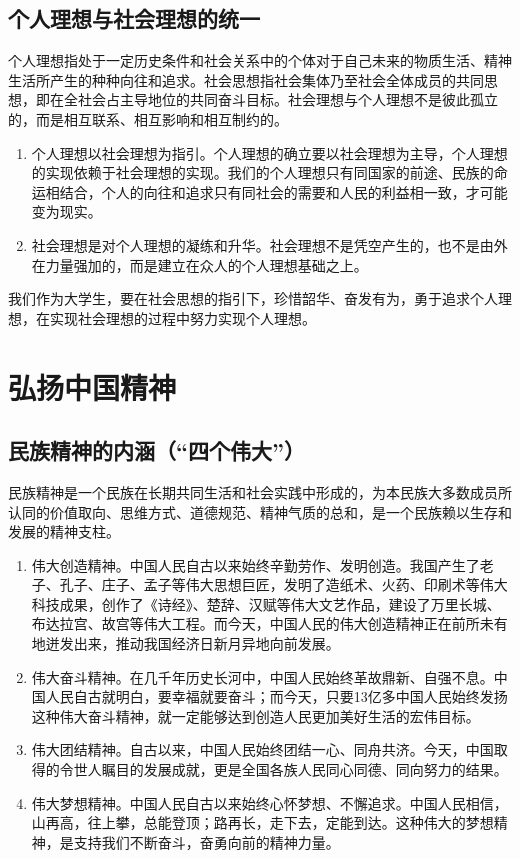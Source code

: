 \subsection{个人理想与社会理想的统一}
个人理想指处于一定历史条件和社会关系中的个体对于自己未来的物质生活、精神生活所产生的种种向往和追求。社会思想指社会集体乃至社会全体成员的共同思想，即在全社会占主导地位的共同奋斗目标。社会理想与个人理想不是彼此孤立的，而是相互联系、相互影响和相互制约的。
\begin{enumerate}
\item 个人理想以社会理想为指引。个人理想的确立要以社会理想为主导，个人理想的实现依赖于社会理想的实现。我们的个人理想只有同国家的前途、民族的命运相结合，个人的向往和追求只有同社会的需要和人民的利益相一致，才可能变为现实。
\item 社会理想是对个人理想的凝练和升华。社会理想不是凭空产生的，也不是由外在力量强加的，而是建立在众人的个人理想基础之上。
\end{enumerate}

我们作为大学生，要在社会思想的指引下，珍惜韶华、奋发有为，勇于追求个人理想，在实现社会理想的过程中努力实现个人理想。

\section{弘扬中国精神}
\subsection{民族精神的内涵（“四个伟大”）}
民族精神是一个民族在长期共同生活和社会实践中形成的，为本民族大多数成员所认同的价值取向、思维方式、道德规范、精神气质的总和，是一个民族赖以生存和发展的精神支柱。
\begin{enumerate}
\item 伟大创造精神。中国人民自古以来始终辛勤劳作、发明创造。我国产生了老子、孔子、庄子、孟子等伟大思想巨匠，发明了造纸术、火药、印刷术等伟大科技成果，创作了《诗经》、楚辞、汉赋等伟大文艺作品，建设了万里长城、布达拉宫、故宫等伟大工程。而今天，中国人民的伟大创造精神正在前所未有地迸发出来，推动我国经济日新月异地向前发展。
\item 伟大奋斗精神。在几千年历史长河中，中国人民始终革故鼎新、自强不息。中国人民自古就明白，要幸福就要奋斗；而今天，只要13亿多中国人民始终发扬这种伟大奋斗精神，就一定能够达到创造人民更加美好生活的宏伟目标。
\item 伟大团结精神。自古以来，中国人民始终团结一心、同舟共济。今天，中国取得的令世人瞩目的发展成就，更是全国各族人民同心同德、同向努力的结果。
\item 伟大梦想精神。中国人民自古以来始终心怀梦想、不懈追求。中国人民相信，山再高，往上攀，总能登顶；路再长，走下去，定能到达。这种伟大的梦想精神，是支持我们不断奋斗，奋勇向前的精神力量。
\end{enumerate}

